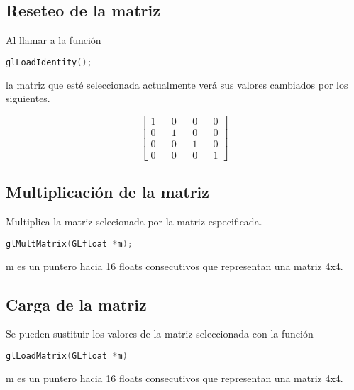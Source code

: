 \subsection{Reseteo de la matriz}
Al llamar a la función
\begin{lstlisting}[language=C]
  glLoadIdentity();
\end{lstlisting}
la matriz que esté seleccionada actualmente verá sus valores cambiados por los siguientes.
\begin{figure}[ht]
  \centering
  \[
  \begin{bmatrix}
    1 && 0 && 0 && 0\\
    0 && 1 && 0 && 0\\
    0 && 0 && 1 && 0\\
    0 && 0 && 0 && 1
  \end{bmatrix}
  \]
\end{figure}
\subsection{Multiplicación de la matriz}
Multiplica la matriz selecionada por la matriz especificada.
\begin{lstlisting}[language=C]
  glMultMatrix(GLfloat *m);
\end{lstlisting}
m es un puntero hacia 16 floats consecutivos que representan una matriz 4x4.
\subsection{Carga de la matriz}
Se pueden sustituir los valores de la matriz seleccionada con la función
\begin{lstlisting}[language=C]
  glLoadMatrix(GLfloat *m)
\end{lstlisting}
m es un puntero hacia 16 floats consecutivos que representan una matriz 4x4.


